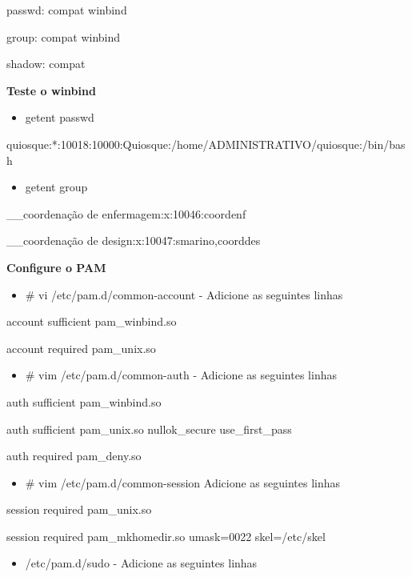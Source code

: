 	passwd:         compat winbind

	group:          compat winbind

	shadow:         compat

\textbf{Teste o winbind}

\begin{itemize}
	\item {getent passwd}
\end{itemize}

quiosque:*:10018:10000:Quiosque:/home/ADMINISTRATIVO/quiosque:/bin/bash

\begin{itemize}
	\item {getent group}
\end{itemize}

\_\_coordenação de enfermagem:x:10046:coordenf

\_\_coordenação de design:x:10047:smarino,coorddes

\textbf{Configure o PAM}

\begin{itemize}
	\item {\# vi /etc/pam.d/common-account} - Adicione as seguintes linhas
\end{itemize}

account sufficient       pam\_winbind.so

account required         pam\_unix.so

\begin{itemize}
	\item {\# vim /etc/pam.d/common-auth} - Adicione as seguintes linhas
\end{itemize}

auth sufficient pam\_winbind.so

auth sufficient pam\_unix.so nullok\_secure use\_first\_pass

auth required   pam\_deny.so

\begin{itemize}
	\item {\# vim /etc/pam.d/common-session} Adicione as seguintes linhas
\end{itemize}

session required pam\_unix.so

session required pam\_mkhomedir.so umask=0022 skel=/etc/skel

\begin{itemize}
	\item {/etc/pam.d/sudo} - Adicione as seguintes linhas
\end{itemize}

